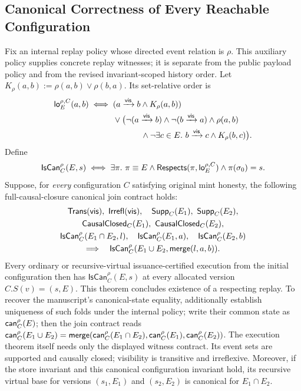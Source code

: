 \subsection{Canonical Correctness of Every Reachable Configuration}\label{sec:adequacy}

\begin{theorem}\label{thm:execution}
Fix an internal replay policy whose directed event relation is $\rho$.
This auxiliary policy supplies concrete replay witnesses; it is separate from
the public payload policy and from the revised invariant-scoped history order.
Let $K_\rho(a,b):=\rho(a,b)\lor\rho(b,a)$. Its set-relative order is
\[
\begin{aligned}
 \F{lo}^{\rho,C}_E(a,b)\iff{}&
 (a\vis b\land K_\rho(a,b))\\
 &\lor\bigl(\neg(a\vis b)\land\neg(b\vis a)\land\rho(a,b)\\
 &\hspace{12mm}\land\neg\exists c\in E.\ b\vis c\land K_\rho(b,c)\bigr).
\end{aligned}
\]
Define
\[
 \mathsf{IsCan}^{\rho}_C(E,s)\iff
 \exists\pi.\ \pi\equiv E\land
 \mathsf{Respects}(\pi,\mathsf{lo}^{\rho,C}_E)\land
 \pi(\sigma_0)=s.
\]
Suppose, for \emph{every} configuration $C$ satisfying
original mint honesty, the following full-causal-closure canonical join
contract holds:
\[
\begin{gathered}
 \mathsf{Trans}(\mathsf{vis}),\ \mathsf{Irrefl}(\mathsf{vis}),\quad
 \mathsf{Supp}_C(E_1),\ \mathsf{Supp}_C(E_2),\\
 \mathsf{CausalClosed}_C(E_1),\ \mathsf{CausalClosed}_C(E_2),\\
 \mathsf{IsCan}^{\rho}_C(E_1\cap E_2,l),\quad
 \mathsf{IsCan}^{\rho}_C(E_1,a),\quad\mathsf{IsCan}^{\rho}_C(E_2,b)\\
 \Longrightarrow\quad\mathsf{IsCan}^{\rho}_C(E_1\cup E_2,\mathsf{merge}(l,a,b)).
\end{gathered}
\]
Every ordinary or recursive-virtual issuance-certified execution from the
initial configuration then has $\mathsf{IsCan}^{\rho}_C(E,s)$ at every allocated
version $C.S(v)=(s,E)$. This theorem concludes existence of a respecting replay. To recover the
manuscript's canonical-state equality, additionally establish uniqueness of
such folds under the internal policy; write their common state as
$\mathsf{can}^{\rho}_C(E)$; then the join contract reads
$\mathsf{can}^{\rho}_C(E_1\cup E_2)=
\mathsf{merge}(\mathsf{can}^{\rho}_C(E_1\cap E_2),
\mathsf{can}^{\rho}_C(E_1),\mathsf{can}^{\rho}_C(E_2))$.
The execution theorem itself needs only the displayed witness contract.
Its event sets are supported and causally closed;
visibility is transitive and irreflexive. Moreover, if the store invariant and
this canonical configuration invariant hold, its recursive virtual base for
versions $(s_1,E_1)$ and $(s_2,E_2)$ is canonical for $E_1\cap E_2$.
\end{theorem}

